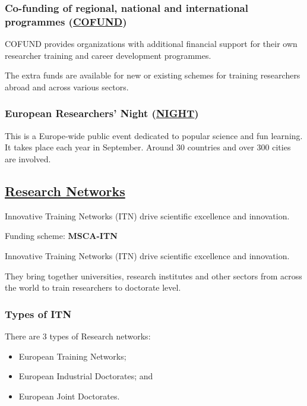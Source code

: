 \documentclass[oneside]{book}
\numberwithin{equation}{section}
\begin{document}
\subsubsection{Co-funding of regional, national and international programmes (\href{https://ec.europa.eu/research/mariecurieactions/actions/co-funding-programmes_en}{COFUND})}
COFUND provides organizations with additional financial support for their own researcher training and career development programmes.

%
The extra funds are available for new or existing schemes for training researchers abroad and across various sectors.

\subsubsection{European Researchers' Night (\href{https://ec.europa.eu/research/mariecurieactions/actions/european-researchers-night_en}{NIGHT})}
This is a Europe-wide public event dedicated to popular science and fun learning. It takes place each year in September. Around 30 countries and over 300 cities are involved.

\subsection{\href{https://ec.europa.eu/research/mariecurieactions/actions/research-networks_en}{Research Networks}}
\begin{center}
    Innovative Training Networks (ITN) drive scientific excellence and innovation.
\end{center}

\begin{flushright}
    Funding scheme: \textbf{MSCA-ITN}
\end{flushright}
Innovative Training Networks (ITN) drive scientific excellence and innovation.

They bring together universities, research institutes and other sectors from across the world to train researchers to doctorate level.

\subsubsection{Types of ITN}
There are 3 types of Research networks:
\begin{itemize}
    \item European Training Networks;
    \item European Industrial Doctorates; and
    \item European Joint Doctorates.
\end{itemize}
\end{document}
